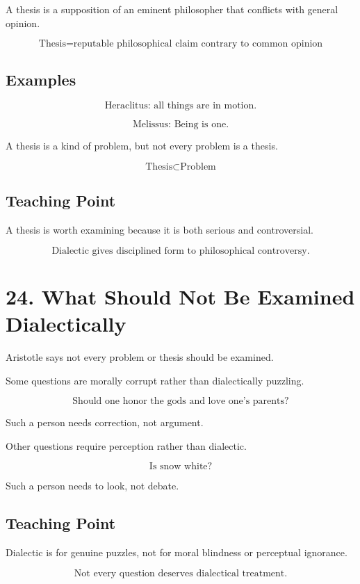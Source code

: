 \documentclass[12pt]{article}
\begin{document}
A thesis is a supposition of an eminent philosopher that conflicts with general
opinion.

\[
\boxed{
\text{Thesis} = \text{reputable philosophical claim contrary to common opinion}
}
\]

\subsection*{Examples}

\[
\text{Heraclitus: all things are in motion.}
\]

\[
\text{Melissus: Being is one.}
\]

A thesis is a kind of problem, but not every problem is a thesis.

\[
\text{Thesis} \subset \text{Problem}
\]

\subsection*{Teaching Point}

A thesis is worth examining because it is both serious and controversial.

\[
\boxed{
\text{Dialectic gives disciplined form to philosophical controversy.}
}
\]

\section*{24. What Should Not Be Examined Dialectically}

Aristotle says not every problem or thesis should be examined.

Some questions are morally corrupt rather than dialectically puzzling.

\[
\text{Should one honor the gods and love one's parents?}
\]

Such a person needs correction, not argument.

Other questions require perception rather than dialectic.

\[
\text{Is snow white?}
\]

Such a person needs to look, not debate.

\subsection*{Teaching Point}

Dialectic is for genuine puzzles, not for moral blindness or perceptual
ignorance.

\[
\boxed{
\text{Not every question deserves dialectical treatment.}
}
\]
\end{document}
